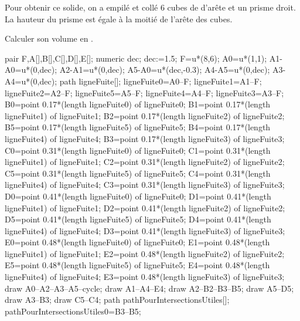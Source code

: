 \begin{exercice*}
    Pour obtenir ce solide, on a empilé et collé \num{6} cubes de  d’arête et un prisme droit.
    La hauteur du prisme est égale à la moitié de l’arête des cubes.

    Calculer son volume en \Vol[cm]{}.

    \begin{Geometrie}
        pair F,A[],B[],C[],D[],E[];
        numeric dec;
        dec:=1.5;
        F=u*(8,6);
        A0=u*(1,1);
        A1-A0=u*(0,dec);
        A2-A1=u*(0,dec);
        A5-A0=u*(dec,-0.3);
        A4-A5=u*(0,dec);
        A3-A4=u*(0,dec);
        path ligneFuite[];
        ligneFuite0=A0--F;
        ligneFuite1=A1--F;
        ligneFuite2=A2--F;
        ligneFuite5=A5--F;
        ligneFuite4=A4--F;
        ligneFuite3=A3--F;
        B0=point 0.17*(length ligneFuite0) of ligneFuite0;
        B1=point 0.17*(length ligneFuite1) of ligneFuite1;
        B2=point 0.17*(length ligneFuite2) of ligneFuite2;
        B5=point 0.17*(length ligneFuite5) of ligneFuite5;
        B4=point 0.17*(length ligneFuite4) of ligneFuite4;
        B3=point 0.17*(length ligneFuite3) of ligneFuite3;
        C0=point 0.31*(length ligneFuite0) of ligneFuite0;
        C1=point 0.31*(length ligneFuite1) of ligneFuite1;
        C2=point 0.31*(length ligneFuite2) of ligneFuite2;
        C5=point 0.31*(length ligneFuite5) of ligneFuite5;
        C4=point 0.31*(length ligneFuite4) of ligneFuite4;
        C3=point 0.31*(length ligneFuite3) of ligneFuite3;
        D0=point 0.41*(length ligneFuite0) of ligneFuite0;
        D1=point 0.41*(length ligneFuite1) of ligneFuite1;
        D2=point 0.41*(length ligneFuite2) of ligneFuite2;
        D5=point 0.41*(length ligneFuite5) of ligneFuite5;
        D4=point 0.41*(length ligneFuite4) of ligneFuite4;
        D3=point 0.41*(length ligneFuite3) of ligneFuite3;
        E0=point 0.48*(length ligneFuite0) of ligneFuite0;
        E1=point 0.48*(length ligneFuite1) of ligneFuite1;
        E2=point 0.48*(length ligneFuite2) of ligneFuite2;
        E5=point 0.48*(length ligneFuite5) of ligneFuite5;
        E4=point 0.48*(length ligneFuite4) of ligneFuite4;
        E3=point 0.48*(length ligneFuite3) of ligneFuite3;        
        draw A0--A2--A3--A5--cycle;
        draw A1--A4--E4;
        draw A2--B2--B3--B5;
        draw A5--D5;
        draw A3--B3;
        draw C5--C4;                
        path pathPourIntersectionsUtiles[];
        pathPourIntersectionsUtiles0=B3--B5;

\end{Geometrie}
\end{exercice*}
